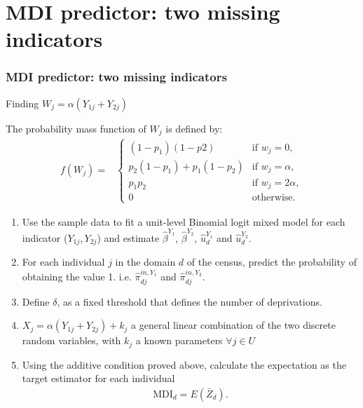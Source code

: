 \documentclass [xcolor=svgnames, t, 9pt] {beamer}
\begin{document}
\appendix
\section{MDI predictor: two missing indicators}\label{AppendixA}
\begin{frame}
\frametitle{MDI predictor: two missing indicators}

\hyperlink{point}{}

Finding $W_{j}=\alpha\left(Y_{1j}+Y_{2j}\right)$


The probability mass function of $W_{j}$ is defined by:
\begin{align*}
f\left(W_{j}\right)= & \begin{cases}
\left(1-p_{1}\right)\left(1-p2\right) & \text{if }w_{j}=0,\\
p_{2}\left(1-p_{1}\right)+p_{1}\left(1-p_{2}\right) & \text{if }w_{j}=\alpha,\\
p_{1}p_{2} & \text{if }w_{j}=2\alpha,\\
0 & \text{otherwise}.
\end{cases}
\end{align*}

\begin{enumerate}
\item  Use the sample data to fit a unit-level Binomial logit mixed model for each indicator ($Y_{1j}, Y_{2j}$) and estimate $\hat{\beta}^{Y_1}$, $\hat{\beta}^{Y_2}$, $\hat{u}^{Y_1}_d$ and $\hat{u}^{Y_2}_d$. 

\item For each individual $j$ in the domain $d$ of the census, predict the probability of obtaining the value 1. i.e. $\hat{\pi}^{in,Y_1}_{dj}$ and $ \hat{\pi}^{in,Y_2}_{dj}$. 

\item Define $\delta$, as a fixed threshold that defines the number of deprivations. 

 \item $X_{j}=\alpha\left(Y_{1j}+Y_{2j}\right)+k_{j}$ a general linear combination of the two discrete random variables, with $k_{j}$
a known parameters $\forall j \in U$

\item Using the additive condition proved above, calculate the expectation as the target estimator for each individual
\begin{align*}
\text{MDI}_d=E\left(\bar{Z}_{d}\right).
\end{align*}
\end{enumerate}



\end{frame}
\end{document}

